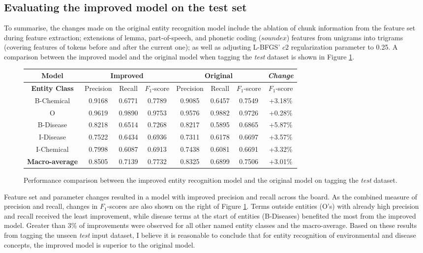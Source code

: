 \documentclass[10pt, oneside]{article}
\begin{document}
\subsection{Evaluating the improved model on the test set}

To summarise, the changes made on the original entity recognition model include the ablation of chunk information from the feature set during feature extraction; extensions of lemma, part-of-speech, and phonetic coding ($soundex$) features from unigrams into trigrams (covering features of tokens before and after the current one); as well as adjusting L-BFGS' $c2$ regularization parameter to 0.25. A comparison between the improved model and the original model when tagging the \emph{test} dataset is shown in Figure \ref{fig:improved-compare}.

\begin{figure}[h]
\begin{center}
\fontsize{9}{11}\selectfont
\begin{tabular}{|*{7}{c|}|c|}\hline
\textbf{Model}  & \multicolumn{3}{c|}{\textbf{Improved}} & \multicolumn{3}{c||}{\textbf{Original}} & \emph{Change} \\ \hline 
\textbf{Entity Class} & Precision & Recall & $F_1$-score & Precision & Recall & $F_1$-score & $F_1$-score \\ \hline
B-Chemical & 0.9168 & 0.6771 & 0.7789 & 0.9085 & 0.6457 & 0.7549 & +3.18\% \\ \hline
O                 & 0.9619 & 0.9890 & 0.9753 & 0.9576 & 0.9882 & 0.9726 & +0.28\% \\ \hline
B-Disease   & 0.8218 & 0.6514 & 0.7268 & 0.8217 & 0.5895 & 0.6865 & +5.87\% \\ \hline
I-Disease    & 0.7522 & 0.6434 & 0.6936 & 0.7311 & 0.6178 & 0.6697 & +3.57\% \\ \hline
I-Chemical  & 0.7998 & 0.6087 & 0.6913 & 0.7438 & 0.6081 & 0.6691 & +3.32\% \\ \hline
\textbf{Macro-average} & 0.8505 & 0.7139 & 0.7732 & 0.8325 & 0.6899 & 0.7506 & +3.01\% \\ \hline
\end{tabular}
\caption{\label{fig:improved-compare} Performance comparison between the improved entity recognition model and the original model on tagging the \emph{test} dataset.}
\end{center}
\end{figure}

Feature set and parameter changes resulted in a model with improved precision and recall across the board. As the combined measure of precision and recall, changes in $F_1$-scores are also shown on the right of Figure \ref{fig:improved-compare}. Terms outside entities (O's) with already high precision and recall received the least improvement, while disease terms at the start of entities (B-Diseases) benefited the most from the improved model. Greater than 3\% of improvements were observed for all other named entity classes and the macro-average. Based on these results from tagging the unseen \emph{test} input dataset, I believe it is reasonable to conclude that for entity recognition of environmental and disease concepts, the improved model is superior to the original model.
\end{document}
